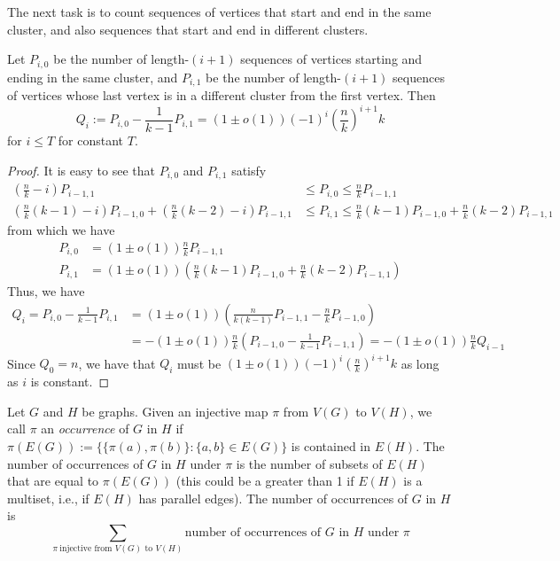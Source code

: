 The next task is to count sequences of vertices that start and end in the same cluster, and also sequences that start and end in different clusters.
\begin{proposition}	\label{prop:num-seq}
	Let $P_{i,0}$ be the number of length-$(i+1)$ sequences of vertices starting and ending in the same cluster, and $P_{i,1}$ be the number of length-$(i+1)$ sequences of vertices whose last vertex is in a different cluster from the first vertex.  Then
	\[
		Q_i := P_{i,0}-\frac{1}{k-1}P_{i,1} = (1\pm o(1))(-1)^i \left(\frac{n}{k}\right)^{i+1}k
	\]
	for $i\le T$ for constant $T$.
\end{proposition}
\begin{proof}
	It is easy to see that $P_{i,0}$ and $P_{i,1}$ satisfy
	\begin{align*}
		\left(\frac{n}{k}-i\right)P_{i-1,1} &\le P_{i,0} \le \frac{n}{k}P_{i-1,1}\\
		\left(\frac{n}{k}(k-1)-i\right)P_{i-1,0} + \left(\frac{n}{k}(k-2)-i\right)P_{i-1,1} &\le P_{i,1} \le \frac{n}{k}(k-1)P_{i-1,0} + \frac{n}{k}(k-2)P_{i-1,1}
	\end{align*}
	from which we have
	\begin{align*}
		P_{i,0} &= (1\pm o(1)) \frac{n}{k}P_{i-1,1}\\
		P_{i,1} &= (1\pm o(1)) \left(\frac{n}{k}(k-1)P_{i-1,0} + \frac{n}{k}(k-2)P_{i-1,1}\right)
	\end{align*}
	Thus, we have
	\begin{align*}
		Q_i = P_{i,0} - \frac{1}{k-1}P_{i,1} &= (1\pm o(1))\left(\frac{n}{k(k-1)}P_{i-1,1} - \frac{n}{k}P_{i-1,0}\right)\\
		&= -(1\pm o(1))\frac{n}{k}\left(P_{i-1,0}-\frac{1}{k-1}P_{i-1,1}\right) = -(1\pm o(1))\frac{n}{k}Q_{i-1}
	\end{align*}
Since $Q_0 = n$, we have that $Q_i$ must be $(1\pm o(1))(-1)^{i}\left(\frac{n}{k}\right)^{i+1}k$ as long as $i$ is constant.
\end{proof}


\begin{definition}
	Let $G$ and $H$ be graphs.  Given an injective map $\pi$ from $V(G)$ to $V(H)$, we call $\pi$ an \emph{occurrence} of $G$ in $H$ if $\pi(E(G)) := \{\{\pi(a),\pi(b)\}:\{a,b\}\in E(G)\}$ is contained in $E(H)$.  The number of occurrences of $G$ in $H$ under $\pi$ is the number of subsets of $E(H)$ that are equal to $\pi(E(G))$ (this could be a greater than 1 if $E(H)$ is a multiset, i.e., if $E(H)$ has parallel edges).  The number of occurrences of $G$ in $H$ is
	\[
		\sum_{\pi~\text{injective from $V(G)$ to $V(H)$}} \text{number of occurrences of $G$ in $H$ under $\pi$}
	\]
\end{definition}

